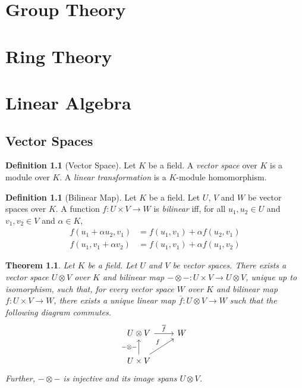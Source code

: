 \documentclass{book}
\newtheorem{thm}[prop]{Theorem}
\theoremstyle{definition}
\newtheorem{df}[prop]{Definition}
\begin{document}
\part{Group Theory}



\part{Ring Theory}



\part{Linear Algebra}

\chapter{Vector Spaces}

\begin{df}[Vector Space]
Let $K$ be a field. A \emph{vector space} over $K$ is a module over $K$. A \emph{linear transformation} is a $K$-module homomorphism.
\end{df}

\begin{df}[Bilinear Map]
Let $K$ be a field. Let $U$, $V$ and $W$ be vector spaces over $K$. A function $f : U \times V \rightarrow W$ is \emph{bilinear} iff, for all $u_1, u_2 \in U$ and $v_1,v_2 \in V$ and $\alpha \in K$,
\begin{align*}
f(u_1 + \alpha u_2, v_1) & = f(u_1,v_1) + \alpha f(u_2,v_1) \\
f(u_1, v_1 + \alpha v_2) & = f(u_1,v_1) + \alpha f(u_1,v_2)
\end{align*}
\end{df}

\begin{thm}
Let $K$ be a field. Let $U$ and $V$ be vector spaces. There exists a vector space $U \otimes V$ over $K$ and bilinear map $- \otimes - : U \times V \rightarrow U \otimes V$, unique up to isomorphism, such that, for every vector space $W$ over $K$ and bilinear map $f : U \times V \rightarrow W$, there exists a unique linear map $\overline{f} : U \otimes V \rightarrow W$ such that the following diagram commutes.
\[ \begin{tikzcd}
U \otimes V \arrow[r,"\overline{f}"] & W \\
U \times V \arrow[u,"- \otimes -"] \arrow[ur,"f"]
\end{tikzcd} \]
Further, $- \otimes -$ is injective and its image spans $U \otimes V$.
\end{thm}
\end{document}
